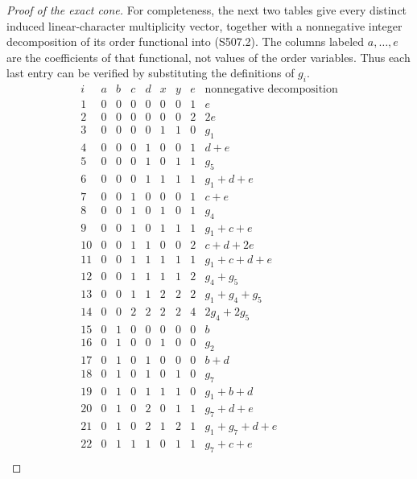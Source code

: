 \begin{proof}[Proof of the exact cone]
For completeness, the next two tables give every distinct induced
linear-character multiplicity vector, together with a nonnegative
integer decomposition of its order functional into (S507.2).
The columns labeled $a,\ldots,e$ are the coefficients of that
functional, not values of the order variables.  Thus each last
entry can be verified by substituting the definitions of $g_i$.
\[
\begin{array}{r|rrrrrrr|l}
 i&a&b&c&d&x&y&e&\text{nonnegative decomposition}\\\hline
1 & 0 & 0 & 0 & 0 & 0 & 0 & 1 & e \\
2 & 0 & 0 & 0 & 0 & 0 & 0 & 2 & 2e \\
3 & 0 & 0 & 0 & 0 & 1 & 1 & 0 & g_1 \\
4 & 0 & 0 & 0 & 1 & 0 & 0 & 1 & d+e \\
5 & 0 & 0 & 0 & 1 & 0 & 1 & 1 & g_5 \\
6 & 0 & 0 & 0 & 1 & 1 & 1 & 1 & g_1+d+e \\
7 & 0 & 0 & 1 & 0 & 0 & 0 & 1 & c+e \\
8 & 0 & 0 & 1 & 0 & 1 & 0 & 1 & g_4 \\
9 & 0 & 0 & 1 & 0 & 1 & 1 & 1 & g_1+c+e \\
10 & 0 & 0 & 1 & 1 & 0 & 0 & 2 & c+d+2e \\
11 & 0 & 0 & 1 & 1 & 1 & 1 & 1 & g_1+c+d+e \\
12 & 0 & 0 & 1 & 1 & 1 & 1 & 2 & g_4+g_5 \\
13 & 0 & 0 & 1 & 1 & 2 & 2 & 2 & g_1+g_4+g_5 \\
14 & 0 & 0 & 2 & 2 & 2 & 2 & 4 & 2g_4+2g_5 \\
15 & 0 & 1 & 0 & 0 & 0 & 0 & 0 & b \\
16 & 0 & 1 & 0 & 0 & 1 & 0 & 0 & g_2 \\
17 & 0 & 1 & 0 & 1 & 0 & 0 & 0 & b+d \\
18 & 0 & 1 & 0 & 1 & 0 & 1 & 0 & g_7 \\
19 & 0 & 1 & 0 & 1 & 1 & 1 & 0 & g_1+b+d \\
20 & 0 & 1 & 0 & 2 & 0 & 1 & 1 & g_7+d+e \\
21 & 0 & 1 & 0 & 2 & 1 & 2 & 1 & g_1+g_7+d+e \\
22 & 0 & 1 & 1 & 1 & 0 & 1 & 1 & g_7+c+e \\
\end{array}
\]


\end{proof}
